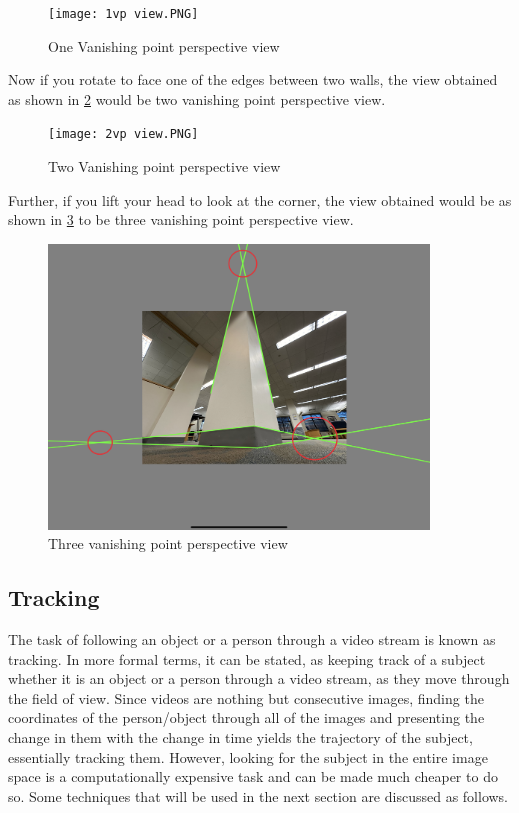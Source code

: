 \begin{figure}[H]
    \centering
    \texttt{[image: 1vp view.PNG]}
    \caption{One Vanishing point perspective view}
    \label{fig: One Vanishing point perspective view}
\end{figure}

Now if you rotate to face one of the edges between two walls, the view obtained as shown in \ref{fig: Two Vanishing point perspective view} would be two vanishing point perspective view.\newline

\begin{figure}[H]
    \centering
    \texttt{[image: 2vp view.PNG]}
    \caption{Two Vanishing point perspective view}
    \label{fig: Two Vanishing point perspective view}
\end{figure}


Further, if you lift your head to look at the corner, the view obtained would be as shown in \ref{fig: Three vanishing point perspective view} to be three vanishing point perspective view.\newline

\begin{figure}[H]
    \centering
    \includegraphics[width=0.9\textwidth]{3vp view.PNG}
    \caption{Three vanishing point perspective view}
    \label{fig: Three vanishing point perspective view}
\end{figure}


\subsection{Tracking}

The task of following an object or a person through a video stream is known as tracking. In more formal terms, it can be stated, as keeping track of a subject whether it is an object or a person through a video stream, as they move through the field of view. Since videos are nothing but consecutive images, finding the coordinates of the person/object through all of the images and presenting the change in them with the change in time yields the trajectory of the subject, essentially tracking them. However, looking for the subject in the entire image space is a computationally expensive task and can be made much cheaper to do so. Some techniques that will be used in the next section are discussed as follows.

